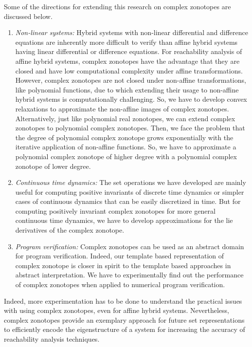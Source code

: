 Some of the directions for extending this research on complex
zonotopes are discussed below.
%
\begin{enumerate}
\item \emph{Non-linear systems: } Hybrid systems with non-linear
  differential and difference equations are inherently more difficult
  to verify than affine hybrid systems having linear differential or
  difference equations.  For reachability analysis of affine hybrid
  systems, complex zonotopes have the advantage that they are closed
  and have low computational complexity under affine transformations.
  However, complex zonotopes are not closed under non-affine
  transformations, like polynomial functions, due to which extending
  their usage to non-affine hybrid systems is computationally
  challenging.  So, we have to develop convex relaxations to
  approximate the non-affine images of complex zonotopes.
  Alternatively, just like polynomial real zonotopes, we can extend
  complex zonotopes to polynomial complex zonotopes.  Then, we face
  the problem that the degree of polynomial complex zonotope grows
  exponentially with the iterative application of non-affine
  functions.  So, we have to approximate a polynomial complex zonotope
  of higher degree with a polynomial complex zonotope of lower degree.
\item \emph{Continuous time dynamics: } The set operations we have
  developed are mainly useful for computing positive invariants of
  discrete time dynamics or simpler cases of continuous dynamics that
  can be easily discretized in time.  But for computing positively
  invariant complex zonotopes for more general continuous time
  dynamics, we have to develop approximations for the lie derivatives
  of the complex zonotope.  
\item \emph{Program verification:  }  Complex zonotopes can be used as
  an abstract domain for program verification.  Indeed, our template
  based representation of complex zonotope is closer in spirit to the
  template based approaches in abstract interpretation.  We have to
  experimentally find out the performance of complex zonotopes when
  applied to numerical program verification.
\end{enumerate}
%
Indeed, more experimentation has to be done to understand the
practical issues with using complex zonotopes, even for affine hybrid
systems.  Nevertheless, complex zonotopes provide an exemplary
approach for future set representations to efficiently encode the
eigenstructure of a system for increasing the accuracy of reachability
analysis techniques.
